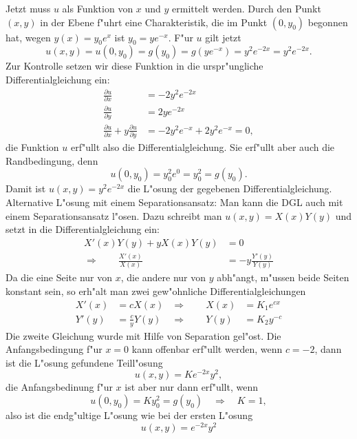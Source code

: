 \begin{loesung}
Jetzt muss $u$ als Funktion von $x$ und $y$ ermittelt werden.
Durch den Punkt $(x,y)$ in der Ebene f"uhrt eine Charakteristik,
die im Punkt $(0,y_0)$ begonnen hat, wegen $y(x)=y_0e^x$ ist
$y_0=ye^{-x}$. F"ur $u$ gilt jetzt
\[
u(x,y)=u(0,y_0)=g(y_0)=g(ye^{-x})=y^2e^{-2x}=y^2e^{-2x}.
\]
Zur Kontrolle setzen wir diese Funktion in die urspr"ungliche
Differentialgleichung ein:
\begin{align*}
\frac{\partial u}{\partial x}
&=
-2y^2e^{-2x}
\\
\frac{\partial u}{\partial y}
&=
2ye^{-2x}
\\
\frac{\partial u}{\partial x}
+y
\frac{\partial u}{\partial y}
&=
-2y^2e^{-x}
+2y^2e^{-x}
=0,
\end{align*}
die Funktion $u$ erf"ullt also die Differentialgleichung. Sie erf"ullt
aber auch die Randbedingung, denn
\[
u(0,y_0)=y_0^2e^0=y_0^2=g(y_0).
\]
Damit ist $u(x,y)=y^2e^{-2x}$ die L"osung der gegebenen Differentialgleichung.
Alternative L"osung mit einem Separationsansatz: Man kann die DGL auch
mit einem Separationsansatz l"osen. Dazu schreibt man $u(x,y)=X(x)Y(y)$
und setzt in die Differentialgleichung ein:
\begin{align*}
X'(x)Y(y)+yX(x)Y(y)&=0\\
\Rightarrow\qquad \frac{X'(x)}{X(x)}&=-y\frac{Y'(y)}{Y(y)}
\end{align*}
Da die eine Seite nur von $x$, die andere nur von $y$ abh"angt, m"ussen
beide Seiten konstant sein, so erh"alt man zwei gew"ohnliche
Differentialgleichungen
\begin{align*}
X'(x)&=cX(x)&\Rightarrow\qquad X(x)&=K_1e^{cx}\\
Y'(y)&=\frac{c}{y}Y(y)&\Rightarrow\qquad Y(y)&=K_2y^{-c}
\end{align*}
Die zweite Gleichung wurde mit Hilfe von Separation gel"ost.
Die Anfangsbedingung f"ur $x=0$ kann offenbar erf"ullt werden,
wenn $c=-2$, dann ist die L"osung gefundene Teill"osung
\[
u(x,y)=Ke^{-2x}y^2,
\]
die Anfangsbedinung f"ur $x$ ist aber nur dann erf"ullt, wenn
\[
u(0,y_0)=Ky_0^2=g(y_0)\quad\Rightarrow\quad K=1,
\]
also ist die endg"ultige L"osung wie bei der ersten L"osung
\[
u(x,y)=e^{-2x}y^2
\]
\end{loesung}
